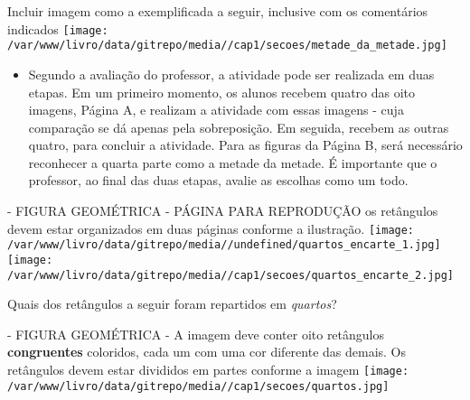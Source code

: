\documentclass[a4paper,12pt,twoside]{book}
\begin{document}
\begin{professor*}[breakable]{}{}
  
  \begin{imagem*}[breakable]{}{}     Incluir imagem como a exemplificada a seguir, inclusive com os comentários indicados    
        \texttt{[image: /var/www/livro/data/gitrepo/media//cap1/secoes/metade\_da\_metade.jpg]}    
  \end{imagem*}  
  
\begin{itemize} %
    \item       Segundo a avaliação do professor, a atividade pode ser realizada em duas etapas. Em um primeiro momento, os alunos recebem quatro das oito imagens, Página A, e realizam a atividade com essas imagens - cuja comparação se dá apenas pela sobreposição. Em seguida, recebem as outras quatro, para concluir a atividade. Para as figuras da Página B, será necessário reconhecer a quarta parte como a metade da metade. É importante que o professor, ao final das duas etapas, avalie as escolhas como um todo.
\end{itemize} %
  
  
  \begin{imagem*}[breakable]{}{}    
    \begin{nota*}[breakable]{}{}       - FIGURA GEOMÉTRICA - PÁGINA PARA REPRODUÇÃO      
      os retângulos devem estar organizados em duas páginas conforme a ilustração.       
                   \texttt{[image: /var/www/livro/data/gitrepo/media//undefined/quartos\_encarte\_1.jpg]}                     \texttt{[image: /var/www/livro/data/gitrepo/media//cap1/secoes/quartos\_encarte\_2.jpg]}      
    \end{nota*}    
  \end{imagem*}  
  
\end{professor*}


Quais dos retângulos a seguir foram repartidos em {\it quartos}?

\begin{imagem*}[breakable]{}{}   - FIGURA GEOMÉTRICA - A imagem deve conter oito retângulos   {\bf congruentes}   coloridos, cada um com uma cor diferente das demais. Os retângulos devem estar divididos em partes conforme a imagem   
    \texttt{[image: /var/www/livro/data/gitrepo/media//cap1/secoes/quartos.jpg]}  
  
\end{imagem*}
\end{document}
